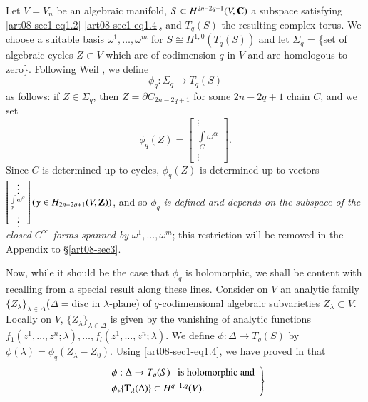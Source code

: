 Let $V=V_{n}$ be an algebraic manifold, $S\subset H^{2n-2q+1}(V,\mathbf{C})$ a subspace satisfying \eqref{art08-sec1-eq1.2}-\eqref{art08-sec1-eq1.4}, and $T_{q}(S)$ the resulting complex torus. We choose a suitable basis $\omega^{1},\ldots,\omega^{m}$ for $S\cong H^{1,0}(T_{q}(S))$ and let $\Sigma_{q}$ = \{set of algebraic cycles $Z\subset V$ which are of codimension $q$ in $V$ and are homologous to zero\}. Following Weil \cite{art08-key22}, we define
\setcounter{equation}{0}
\begin{equation}
\phi_{q}:\Sigma_{q}\to T_{q}(S)\label{art08-sec3-eq3.1}
\end{equation}
as follows: if $Z\in \Sigma_{q}$, then $Z=\partial C_{2n-2q+1}$ for some $2n-2q+1$ chain $C$, and we set 
\begin{equation}
\phi_{q}(Z)=
\begin{bmatrix}
\vdots\\
\int\limits_{C}\omega^{\alpha}\\
\vdots
\end{bmatrix}.\label{art08-sec3-eq3.2}
\end{equation}\pageoriginale
Since $C$ is determined up to cycles, $\phi_{q}(Z)$ is determined up to vectors $\left[\begin{smallmatrix}\vdots\\ \int\limits_{\gamma}\omega^{\alpha}\\ \vdots\end{smallmatrix}\right](\gamma\in H_{2n-2q+1}(V,\mathbf{Z}))$, and so $\phi_{q}$ {\em is defined and depends on the subspace of the closed $C^{\infty}$ forms spanned by} $\omega^{1},\ldots,\omega^{m}$; this restriction will be removed in the Appendix to \S\ref{art08-sec3}.

Now, while it should be the case that $\phi_{q}$ is holomorphic, we shall be content with recalling from \cite{art08-key9} a special result along these lines. Consider on $V$ an analytic family $\{Z_{\lambda}\}_{\lambda\in \Delta}$($\Delta=\text{disc in~}\lambda\text{-plane}$) of $q$-codimensional algebraic subvarieties $Z_{\lambda}\subset V$. Locally on $V$, $\{Z_{\lambda}\}_{\lambda\in \Delta}$ is given by the vanishing of analytic functions $f_{1}(z^{1},\ldots,z^{n};\lambda),\ldots,f_{l}(z^{1},\ldots,z^{n};\lambda)$. We define $\phi:\Delta\to T_{q}(S)$ by $\phi(\lambda)=\phi_{q}(Z_{\lambda}-Z_{0})$. Using  \eqref{art08-sec1-eq1.4}, we have proved in \cite{art08-key9} that
\begin{equation}
\left.
\begin{array}{l}
\phi :\Delta\to T_{q}(S)\text{~~ is holomorphic and}\\[4pt]
\phi_{*}\{\mathbf{T}_{\lambda}(\Delta)\}\subset H^{q-1,q}(V).
\end{array}\right\}\label{art08-sec3-eq3.3}
\end{equation}

